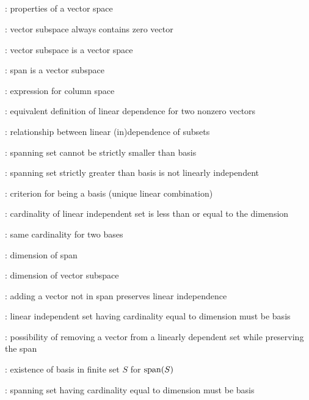 \subsection*{}
\item {}: properties of a vector space
\item {}: vector subspace always contains zero vector
\item {}: vector subspace is a vector space
\item {}: span is a vector subspace
\item {}: expression for column space
\item {}: equivalent definition of linear dependence for two nonzero vectors
\item {}: relationship between linear (in)dependence of subsets
\item {}: spanning set cannot be strictly smaller than basis
\item {}: spanning set strictly greater than basis is not linearly independent
\item {}: criterion for being a basis (unique linear combination)
\item {}: cardinality of linear independent set is less than or equal to the dimension
\item {}: same cardinality for two bases
\item {}: dimension of span
\item {}: dimension of vector subspace
\item {}: adding a vector not in span preserves linear independence
\item {}: linear independent set having cardinality equal to dimension must be basis
\item {}: possibility of removing a vector from a linearly dependent set while preserving the span
\item {}: existence of basis in finite set \(S\) for \(\operatorname{span}(S)\)
\item {}: spanning set having cardinality equal to dimension must be basis
